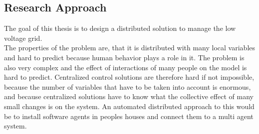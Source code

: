 \documentclass[a4paper]{article}
\begin{document}
\subsection{Research Approach}
The goal of this thesis is to design a distributed solution to manage the low voltage grid. \\
The properties of the problem are, that it is distributed with many local variables and hard to predict because human behavior plays a role
in it. The problem is also very complex and the effect of interactions of many people on the model is hard to predict. Centralized control
solutions are therefore hard if not impossible, because the number of variables that have to be taken into account is enormous, and
because centralized solutions have to know what the collective effect of many small changes is on the system. An automated distributed 
approach to this would be to install software agents in peoples houses and connect them to a multi agent system.\\
\end{document}
